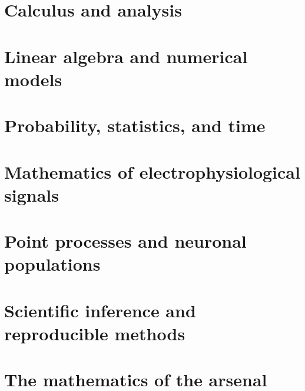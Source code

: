 \documentclass[11pt,a4paper,oneside,openany]{book}
\numberwithin{equation}{chapter}
\theoremstyle{definition}
\begin{document}
\part{Calculus and analysis}





\part{Linear algebra and numerical models}




\part{Probability, statistics, and time}




\part{Mathematics of electrophysiological signals}







\part{Point processes and neuronal populations}




\part{Scientific inference and reproducible methods}


\part{The mathematics of the arsenal}




\appendix



\backmatter

\end{document}
